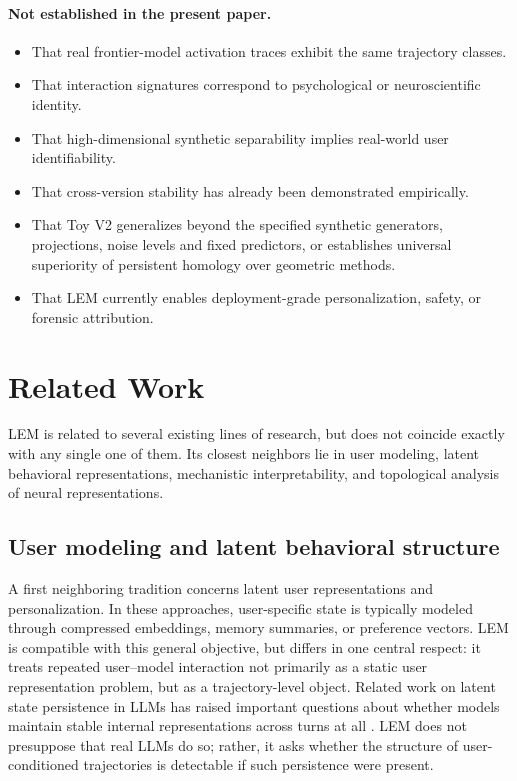 \documentclass[11pt]{article}
\begin{document}
\paragraph{Not established in the present paper.}
\begin{itemize}[leftmargin=1.8em]
  \item That real frontier-model activation traces exhibit the same trajectory
        classes.
  \item That interaction signatures correspond to psychological or neuroscientific
        identity.
  \item That high-dimensional synthetic separability implies real-world user
        identifiability.
  \item That cross-version stability has already been demonstrated empirically.
  \item That Toy V2 generalizes beyond the specified synthetic generators,
        projections, noise levels and fixed predictors, or establishes universal
        superiority of persistent homology over geometric methods.
  \item That LEM currently enables deployment-grade personalization, safety, or
        forensic attribution.
\end{itemize}


\section{Related Work}

LEM is related to several existing lines of research, but does not coincide exactly
with any single one of them. Its closest neighbors lie in user modeling, latent
behavioral representations, mechanistic interpretability, and topological analysis
of neural representations.

\subsection{User modeling and latent behavioral structure}

A first neighboring tradition concerns latent user representations and
personalization. In these approaches, user-specific state is typically modeled
through compressed embeddings, memory summaries, or preference vectors. LEM is
compatible with this general objective, but differs in one central respect: it
treats repeated user--model interaction not primarily as a static user
representation problem, but as a trajectory-level object. Related work on latent
state persistence in LLMs has raised important questions about whether models
maintain stable internal representations across turns at all
\cite{huang2025latentstate}. LEM does not presuppose that real LLMs do so; rather,
it asks whether the structure of user-conditioned trajectories is detectable if
such persistence were present.
\end{document}
